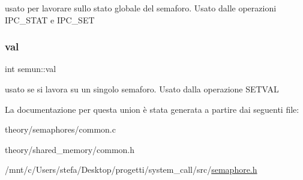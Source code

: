 usato per lavorare sullo stato globale del semaforo. Usato dalle operazioni I\+P\+C\+\_\+\+S\+T\+AT e I\+P\+C\+\_\+\+S\+ET \mbox{\label{unionsemun_ac6121ecb6d04a024e07e12bd71b94031}} 
\subsubsection{\texorpdfstring{val}{val}}
{\footnotesize\ttfamily int semun\+::val}

usato se si lavora su un singolo semaforo. Usato dalla operazione S\+E\+T\+V\+AL 

La documentazione per questa union è stata generata a partire dai seguenti file\+:\begin{DoxyCompactItemize}
\item 
theory/semaphores/common.\+c\item 
theory/shared\+\_\+memory/common.\+h\item 
/mnt/c/\+Users/stefa/\+Desktop/progetti/system\+\_\+call/src/\hyperlink{semaphore_8h}{semaphore.\+h}\end{DoxyCompactItemize}
